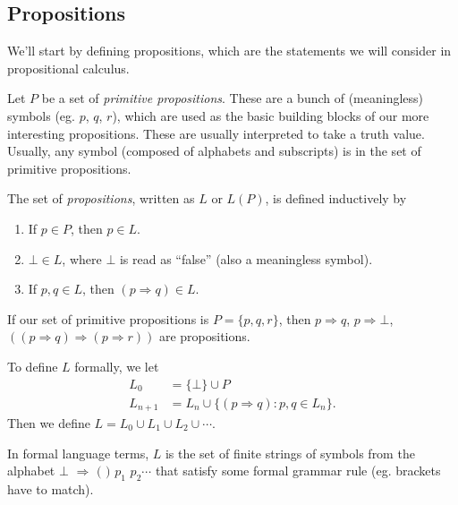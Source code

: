\documentclass[a4paper]{article}
\begin{document}
\subsection{Propositions}
We'll start by defining propositions, which are the statements we will consider in propositional calculus.
\begin{defi}[Propositions]
  Let $P$ be a set of \emph{primitive propositions}. These are a bunch of (meaningless) symbols (eg. $p$, $q$, $r$), which are used as the basic building blocks of our more interesting propositions. These are usually interpreted to take a truth value. Usually, any symbol (composed of alphabets and subscripts) is in the set of primitive propositions.

  The set of \emph{propositions}, written as $L$ or $L(P)$, is defined inductively by
  \begin{enumerate}
    \item If $p\in P$, then $p\in L$.
    \item $\bot\in L$, where $\bot$ is read as ``false'' (also a meaningless symbol).
    \item If $p, q\in L$, then $(p\Rightarrow q)\in L$.
  \end{enumerate}
\end{defi}

\begin{eg}
  If our set of primitive propositions is $P = \{p, q, r\}$, then $p\Rightarrow q$, $p\Rightarrow \bot$, $((p\Rightarrow q)\Rightarrow (p\Rightarrow r))$ are propositions.
\end{eg}

To define $L$ formally, we let
\begin{align*}
  L_0 &= \{\bot\}\cup P\\
  L_{n + 1} &= L_n\cup \{(p\Rightarrow q): p, q\in L_n\}.
\end{align*}
Then we define $L = L_0 \cup L_1\cup L_2\cup \cdots$.

In formal language terms, $L$ is the set of finite strings of symbols from the alphabet $\bot$ $\Rightarrow $ $($ $)$ $p_1$ $p_2 \cdots$ that satisfy some formal grammar rule (eg. brackets have to match).
\end{document}
